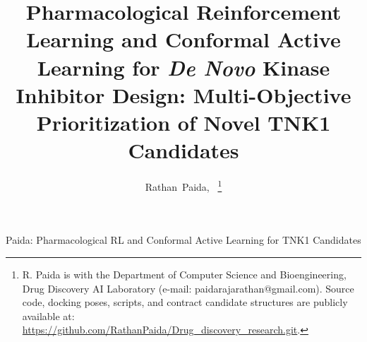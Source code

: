 \documentclass[journal]{IEEEtran}
\begin{document}
\title{Pharmacological Reinforcement Learning and Conformal Active Learning for \textit{De Novo} Kinase Inhibitor Design: Multi-Objective Prioritization of Novel TNK1 Candidates}

\author{Rathan~Paida,~%
\thanks{R. Paida is with the Department of Computer Science and Bioengineering, Drug Discovery AI Laboratory (e-mail: paidarajarathan@gmail.com). Source code, docking poses, scripts, and contract candidate structures are publicly available at: \url{https://github.com/RathanPaida/Drug_discovery_research.git}.}%
}

%
{Paida: Pharmacological RL and Conformal Active Learning for TNK1 Candidates}

\maketitle
\end{document}
